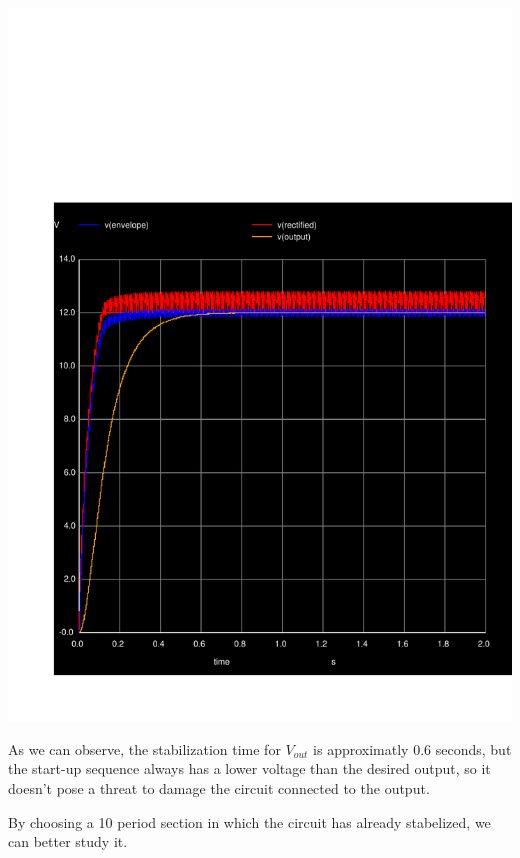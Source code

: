 \includegraphics[width=1\linewidth]{../sim/vinit.pdf}

As we can observe, the stabilization time for $V_{out}$ is approximatly 0.6 seconds, but the start-up sequence always has a lower voltage than the desired output, so it doesn't pose a threat to damage the circuit connected to the output.

\par

By choosing a 10 period section in which the circuit has already stabelized, we can better study it.

